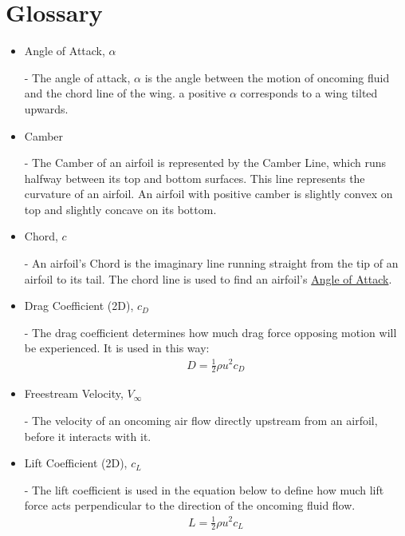 \documentclass{article}
\begin{document}
\section{Glossary}
\begin{itemize}
		
	\item \hypertarget{alpha}{Angle of Attack, $\alpha$} - The angle of attack, $\alpha$ is the angle between the motion of oncoming fluid and the chord line of the wing. a positive $\alpha$ corresponds to a wing tilted upwards.
	
	\item \hypertarget{Camber}{Camber} - The Camber of an airfoil is represented by the Camber Line, which runs halfway between its top and bottom surfaces. This line represents the curvature of an airfoil. An airfoil with positive camber is slightly convex on top and slightly concave on its bottom.
	
	\item \hypertarget{c}{Chord, $c$} - An airfoil's Chord is the imaginary line running straight from the tip of an airfoil to its tail. The chord line is used to find an airfoil's \hyperlink{alpha}{Angle of Attack}.

	\item \hypertarget{CD}{Drag Coefficient (2D), $c_{D}$} - The drag coefficient determines how much drag force opposing motion will be experienced. It is used in this way: 
		\begin{equation} \label{eq:2}
		\begin{aligned}
        			D = \frac{1}{2} \rho u^{2} c_{D}
	    	\end{aligned}
		\end{equation}
	
	\item \hypertarget{Vinf}{Freestream Velocity, $V_{\infty}$} - The velocity of an oncoming air flow directly upstream from an airfoil, before it interacts with it.
		
	\item \hypertarget{CL}{Lift Coefficient (2D), $c_{L}$} - The lift coefficient is used in the equation below to define how much lift force acts perpendicular to the direction of the oncoming fluid flow.
		\begin{equation} \label{eq:3}
		\begin{aligned}
        			L = \frac{1}{2} \rho u^{2} c_{L}
	    	\end{aligned}
		\end{equation}
	

\end{itemize}
\end{document}
